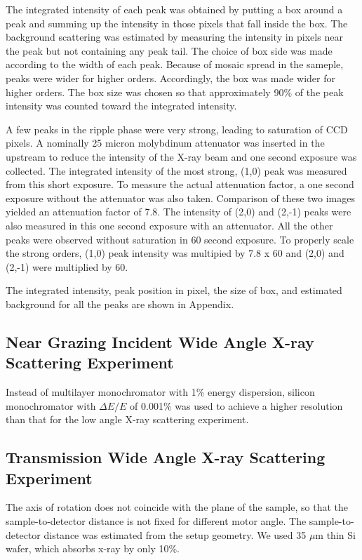 The integrated intensity of each peak was obtained by putting a box around a
peak and summing up the intensity in those pixels that fall inside the box.
The background scattering was estimated by measuring the intensity in pixels
near the peak but not containing any peak tail. The choice of box side was 
made according to the width of each peak. Because of mosaic spread in the sameple,
peaks were wider for higher orders. Accordingly, the box was made wider for higher
orders. The box size was chosen so that approximately 90\% of the peak intensity
was counted toward the integrated intensity.

A few peaks in the ripple phase
were very strong, leading to saturation of CCD pixels. A nominally 25 micron 
molybdinum attenuator was inserted in the upstream to reduce the intensity
of the X-ray beam and one second exposure was collected. The integrated intensity 
of the most strong, (1,0) peak was measured from this short exposure. To
measure the actual attenuation factor, a one second exposure without the 
attenuator was also taken. Comparison of these two images yielded an 
attenuation factor of 7.8. The intensity of (2,0) and (2,-1) peaks were also
measured in this one second exposure with an attenuator. All the other peaks
were observed without saturation in 60 second exposure. To properly scale the 
strong orders, (1,0) peak intensity was multipied by 7.8 x 60 and (2,0) and
(2,-1) were multiplied by 60. 

The integrated intensity, peak position in pixel, the size of box, and estimated
background for all the peaks are shown in Appendix.

\subsection{Near Grazing Incident Wide Angle X-ray Scattering Experiment}
Instead of multilayer monochromator with 1\% energy dispersion, 
silicon monochromator with $\Delta E/E$ of 0.001\% was used to achieve
a higher resolution than that for the low angle X-ray scattering experiment.  

\subsection{Transmission Wide Angle X-ray Scattering Experiment}
The axis of rotation does not coincide with the
plane of the sample, so that the sample-to-detector distance is not fixed
for different motor angle. The sample-to-detector distance was estimated
from the setup geometry. We used 35 $\mu$m thin Si wafer, which absorbs
x-ray by only 10\%. 


